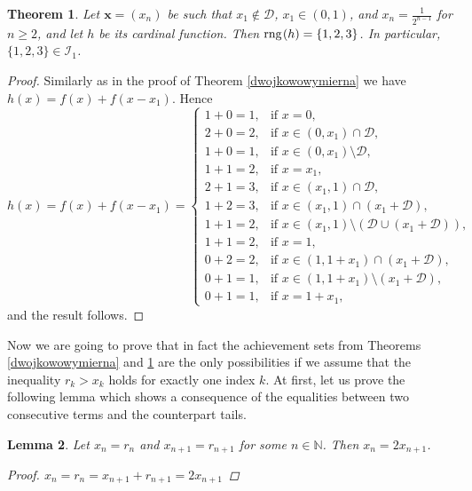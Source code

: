 \documentclass{amsart}
\newtheorem{theorem}{Theorem}[section]
\newtheorem{lemma}[theorem]{Lemma}
\theoremstyle{definition}
\newcommand{\rng}{{\rm rng} \hspace{0.03cm}}
\begin{document}
\begin{theorem}\label{niedwojkowowymierna}
Let $\mathbf{x}=(x_{n})$ be such that $x_{1}\notin\mathcal{D}$, $x_{1}\in (0,1)$, and $x_{n}=\frac{1}{2^{n-1}}$ for $n\geq 2$, and let $h$ be its cardinal function. Then $\rng (h)=\{1,2,3\}$. In particular, $\{1,2,3\}\in \mathcal{I}_1$.
\end{theorem}
\begin{proof}
Similarly as in the proof of Theorem \ref{dwojkowowymierna} we have $h(x)=f(x)+f(x-x_1)$. Hence 
\begin{displaymath}
h(x) = f(x)+f(x-x_1)= \left\{ \begin{array}{ll} 
1+0=1, & \textrm{if $x=0$,}\\ 
2+0=2, & \textrm{if $x\in(0,x_1)\cap \mathcal{D}$,} \\ 
1+0=1, & \textrm{if $x\in(0,x_1)\setminus \mathcal{D}$,} \\ 
1+1=2, & \textrm{if $x=x_1$,}\\ 
2+1=3, & \textrm{if $x\in (x_1,1)\cap \mathcal{D}$,}\\ 
1+2=3, & \textrm{if $x\in (x_1,1)\cap (x_1+\mathcal{D})$,}\\ 
1+1=2, & \textrm{if $x\in (x_1,1)\setminus (\mathcal{D}\cup(x_1+\mathcal{D}))$,}\\ 
1+1=2, & \textrm{if $x=1$,}\\ 
0+2=2, & \textrm{if $x\in (1,1+x_1)\cap (x_1+\mathcal{D})$,}\\ 
0+1=1, & \textrm{if $x\in (1,1+x_1)\setminus (x_1+\mathcal{D})$,}\\ 
0+1=1, & \textrm{if $x=1+x_1$,}\end{array} \right.
\end{displaymath}
and the result follows.
\end{proof}




Now we are going to prove that in fact the achievement sets from Theorems \ref{dwojkowowymierna} and \ref{niedwojkowowymierna} are the only possibilities if we assume that the inequality $r_{k}>x_{k}$ holds for exactly one index $k$. At first, let us prove the following lemma which shows a consequence of the equalities between two consecutive terms and the counterpart tails.

\begin{lemma}\label{dwasasiednie}
Let $x_n=r_n$ and $x_{n+1}=r_{n+1}$ for some $n\in\mathbb{N}$. Then $x_n=2x_{n+1}$.
\begin{proof}
$x_n=r_n=x_{n+1}+r_{n+1}=2x_{n+1}$
\end{proof}
\end{lemma}
\end{document}
